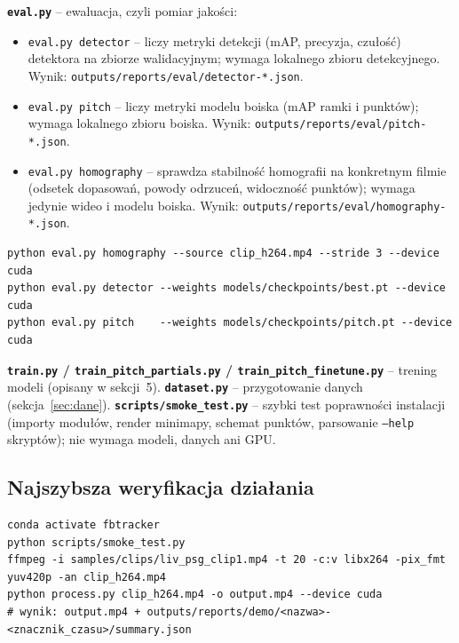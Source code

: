 \documentclass[11pt,a4paper]{article}
\begin{document}
\textbf{\texttt{eval.py}} -- ewaluacja, czyli pomiar jakości:
\begin{itemize}[nosep]
  \item \texttt{eval.py detector} -- liczy metryki detekcji (mAP, precyzja,
        czułość) detektora na zbiorze walidacyjnym; wymaga lokalnego zbioru
        detekcyjnego. Wynik: \texttt{outputs/reports/eval/detector-*.json}.
  \item \texttt{eval.py pitch} -- liczy metryki modelu boiska (mAP ramki i
        punktów); wymaga lokalnego zbioru boiska. Wynik:
        \texttt{outputs/reports/eval/pitch-*.json}.
  \item \texttt{eval.py homography} -- sprawdza stabilność homografii na
        konkretnym filmie (odsetek dopasowań, powody odrzuceń, widoczność
        punktów); wymaga jedynie wideo i modelu boiska. Wynik:
        \texttt{outputs/reports/eval/homography-*.json}.
\end{itemize}
\begin{lstlisting}[style=sh]
python eval.py homography --source clip_h264.mp4 --stride 3 --device cuda
python eval.py detector --weights models/checkpoints/best.pt --device cuda
python eval.py pitch    --weights models/checkpoints/pitch.pt --device cuda
\end{lstlisting}

\textbf{\texttt{train.py} / \texttt{train\_pitch\_partials.py} /
\texttt{train\_pitch\_finetune.py}} -- trening modeli (opisany w sekcji~5).
\textbf{\texttt{dataset.py}} -- przygotowanie danych (sekcja~\ref{sec:dane}).
\textbf{\texttt{scripts/smoke\_test.py}} -- szybki test poprawności instalacji
(importy modułów, render minimapy, schemat punktów, parsowanie \texttt{--help}
skryptów); nie wymaga modeli, danych ani GPU.

\subsection{Najszybsza weryfikacja działania}

\begin{lstlisting}[style=sh]
conda activate fbtracker
python scripts/smoke_test.py
ffmpeg -i samples/clips/liv_psg_clip1.mp4 -t 20 -c:v libx264 -pix_fmt yuv420p -an clip_h264.mp4
python process.py clip_h264.mp4 -o output.mp4 --device cuda
# wynik: output.mp4 + outputs/reports/demo/<nazwa>-<znacznik_czasu>/summary.json
\end{lstlisting}

\end{document}
